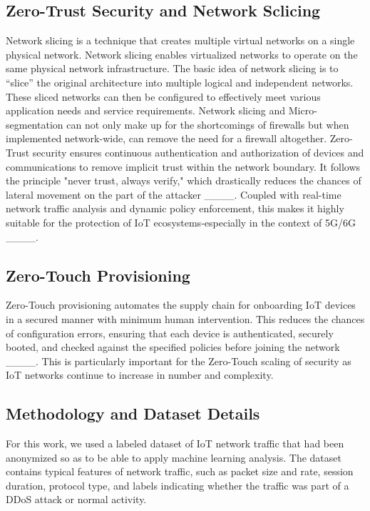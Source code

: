 \subsection{Zero-Trust Security and Network Sclicing}
Network slicing is a technique that creates multiple virtual networks on a single physical network. Network slicing enables virtualized networks to operate on the same physical network infrastructure. The basic idea of network slicing is to “slice” the original architecture into multiple logical and independent networks. These sliced networks can then be configured to effectively meet various application needs and service requirements.
 Network slicing and Micro-segmentation can not only make up for the shortcomings of firewalls but when implemented network-wide, can remove the need for a firewall altogether. Zero-Trust security ensures continuous authentication and authorization of devices and communications to remove implicit trust within the network boundary. It follows the principle "never trust, always verify," which drastically reduces the chances of lateral movement on the part of the attacker ____. Coupled with real-time network traffic analysis and dynamic policy enforcement, this makes it highly suitable for the protection of IoT ecosystems-especially in the context of 5G/6G ____.
\vspace{\baselineskip}

\subsection{Zero-Touch Provisioning}
Zero-Touch provisioning automates the supply chain for onboarding IoT devices in a secured manner with minimum human intervention. This reduces the chances of configuration errors, ensuring that each device is authenticated, securely booted, and checked against the specified policies before joining the network ____. This is particularly important for the Zero-Touch scaling of security as IoT networks continue to increase in number and complexity.
\vspace{\baselineskip}



\subsection{Methodology and Dataset Details}
\label{sec:methodology}

For this work, we used a labeled dataset of IoT network traffic that had been anonymized so as to be able to apply machine learning analysis. The dataset contains typical features of network traffic, such as packet size and rate, session duration, protocol type, and labels indicating whether the traffic was part of a DDoS attack or normal activity.


